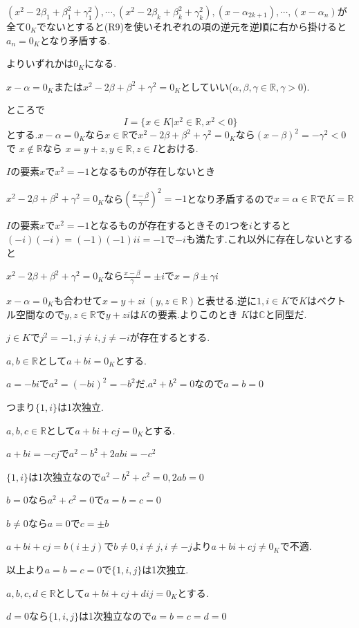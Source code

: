 \documentclass{jsarticle}
\begin{document}
$(x^2-2\beta_1+\beta_1^2+\gamma_1^2),\cdots ,(x^2-2\beta_k+\beta_k^2+\gamma_k^2),(x-\alpha_{2k+1}),\cdots ,(x-\alpha_n)$が全て$0_K$でないとすると(R9)を使いそれぞれの項の逆元を逆順に右から掛けると$a_n=0_K$となり矛盾する.

よりいずれかは$0_K$になる.

$x-\alpha=0_K$または$x^2-2\beta+\beta^2+\gamma^2 = 0_K$としていい($\alpha ,\beta, \gamma\in\mathbb{R},\gamma >0$).

ところで
\[I=\{x\in K|x^2\in\mathbb{R},x^2 < 0\}\]
とする.$x-\alpha=0_K$なら$x\in\mathbb{R}$で$x^2-2\beta+\beta^2+\gamma^2 = 0_K$なら$(x-\beta)^2=-\gamma^2 < 0$で
$x\notin \mathbb{R}$なら
$x=y+z,y\in\mathbb{R},z\in I$とおける.

$I$の要素$x$で$x^2=-1$となるものが存在しないとき

$x^2-2\beta+\beta^2+\gamma^2 = 0_K$なら$(\frac{x-\beta}{\gamma})^2=-1$となり矛盾するので$x=\alpha\in\mathbb{R}$で$K=\mathbb{R}$

$I$の要素$x$で$x^2=-1$となるものが存在するときその1つを$i$とすると$(-i)(-i)=(-1)(-1)ii=-1$で$-i$も満たす.これ以外に存在しないとすると

$x^2-2\beta+\beta^2+\gamma^2 = 0_K$なら$\frac{x-\beta}{\gamma}=\pm i$で$x=\beta \pm \gamma i$

$x-\alpha=0_K$も合わせて$x=y+zi \ (y,z\in\mathbb{R})$と表せる.逆に$1,i\in K$で$K$はベクトル空間なので$y,z\in\mathbb{R}$で$y+zi$は$K$の要素.よりこのとき
$K$は$\mathbb{C}$と同型だ.

$j\in K$で$j^2=-1,j\neq i,j\neq -i$が存在するとする.

$a,b\in\mathbb{R}$として$a+bi=0_K$とする.

$a=-bi$で$a^2=(-bi)^2=-b^2$だ.$a^2+b^2=0$なので$a=b=0$

つまり$\{1,i\}$は1次独立.

$a,b,c\in\mathbb{R}$として$a+bi+cj=0_K$とする.

$a+bi=-cj$で$a^2-b^2+2abi=-c^2$

$\{1,i\}$は1次独立なので$a^2-b^2+c^2=0,2ab=0$

$b=0$なら$a^2+c^2=0$で$a=b=c=0$

$b\neq 0$なら$a=0$で$c=\pm b$

$a+bi+cj=b(i\pm j)$で$b\neq 0,i\neq j,i\neq -j$より$a+bi+cj\neq 0_K$で不適.

以上より$a=b=c=0$で$\{1,i,j\}$は1次独立.

$a,b,c,d\in\mathbb{R}$として$a+bi+cj+dij=0_K$とする.

$d=0$なら$\{1,i,j\}$は1次独立なので$a=b=c=d=0$
\end{document}

